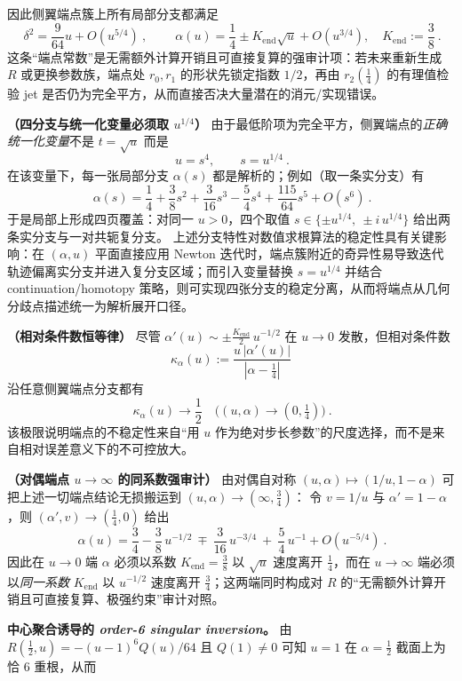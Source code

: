 \begin{remark}[消元曲线的对偶对称、端点奇异簇与 \texorpdfstring{$\alpha=\tfrac12$}{alpha=1/2} 聚合指纹]
\[\]
因此侧翼端点簇上所有局部分支都满足
\[
\boxed{\ \delta^2=\frac{9}{64}u+O(u^{5/4})\ },
\qquad
\boxed{\ \alpha(u)=\frac14\pm K_{\mathrm{end}}\sqrt{u}+O(u^{3/4}),\quad K_{\mathrm{end}}:=\frac{3}{8}\ }.
\]
这条“端点常数”是无需额外计算开销且可直接复算的强审计项：若未来重新生成 \(R\) 或更换参数族，端点处 \(r_0,r_1\) 的形状先锁定指数 \(1/2\)，再由 \(r_2(\tfrac14)\) 的有理值检验 jet 是否仍为完全平方，从而直接否决大量潜在的消元/实现错误。
\par
\noindent\textbf{（四分支与统一化变量必须取 \(u^{1/4}\)）}
由于最低阶项为完全平方，侧翼端点的\emph{正确统一化变量}不是 \(t=\sqrt{u}\) 而是
\[
\boxed{\ u=s^4,\qquad s=u^{1/4}\ }.
\]
在该变量下，每一张局部分支 \(\alpha(s)\) 都是解析的；例如（取一条实分支）有
\[
\boxed{\ \alpha(s)=\frac14+\frac38 s^2+\frac{3}{16}s^3-\frac54 s^4+\frac{115}{64}s^5+O(s^6)\ }.
\]
于是局部上形成四页覆盖：对同一 \(u>0\)，四个取值 \(s\in\{\pm u^{1/4},\ \pm i\,u^{1/4}\}\) 给出两条实分支与一对共轭复分支。
上述分支特性对数值求根算法的稳定性具有关键影响：在 \((\alpha,u)\) 平面直接应用 Newton 迭代时，端点簇附近的奇异性易导致迭代轨迹偏离实分支并进入复分支区域；而引入变量替换 \(s=u^{1/4}\) 并结合 continuation/homotopy 策略，则可实现四张分支的稳定分离，从而将端点从几何分歧点描述统一为解析展开口径。
\par
\noindent\textbf{（相对条件数恒等律）}
尽管 \(\alpha'(u)\sim \pm \tfrac{K_{\mathrm{end}}}{2}\,u^{-1/2}\) 在 \(u\to0\) 发散，但相对条件数
\[
\kappa_\alpha(u):=\frac{u\,|\alpha'(u)|}{|\alpha-\tfrac14|}
\]
沿任意侧翼端点分支都有
\[
\boxed{\ \kappa_\alpha(u)\to\frac12\quad\bigl((u,\alpha)\to(0,\tfrac14)\bigr)\ }.
\]
该极限说明端点的不稳定性来自“用 \(u\) 作为绝对步长参数”的尺度选择，而不是来自相对误差意义下的不可控放大。
\par
\noindent\textbf{（对偶端点 \(u\to\infty\) 的同系数强审计）}
由对偶自对称 \((u,\alpha)\mapsto(1/u,1-\alpha)\) 可把上述一切端点结论无损搬运到 \((u,\alpha)\to(\infty,\tfrac34)\)：
令 \(v=1/u\) 与 \(\alpha'=1-\alpha\)，则 \((\alpha',v)\to(\tfrac14,0)\) 给出
\[
\boxed{\ \alpha(u)=\frac34-\frac38\,u^{-1/2}\ \mp\ \frac{3}{16}\,u^{-3/4}\ +\ \frac54\,u^{-1}+O(u^{-5/4})\ }.
\]
因此在 \(u\to0\) 端 \(\alpha\) 必须以系数 \(K_{\mathrm{end}}=\tfrac38\) 以 \(\sqrt{u}\) 速度离开 \(\tfrac14\)，而在 \(u\to\infty\) 端必须以\emph{同一系数} \(K_{\mathrm{end}}\) 以 \(u^{-1/2}\) 速度离开 \(\tfrac34\)；这两端同时构成对 \(R\) 的“无需额外计算开销且可直接复算、极强约束”审计对照。
\par
\noindent\textbf{中心聚合诱导的 \emph{order-6 singular inversion}。}
由 \(R(\tfrac12,u)=-(u-1)^6Q(u)/64\) 且 \(Q(1)\neq0\) 可知 \(u=1\) 在 \(\alpha=\tfrac12\) 截面上为恰 \(6\) 重根，从而

\end{remark}
